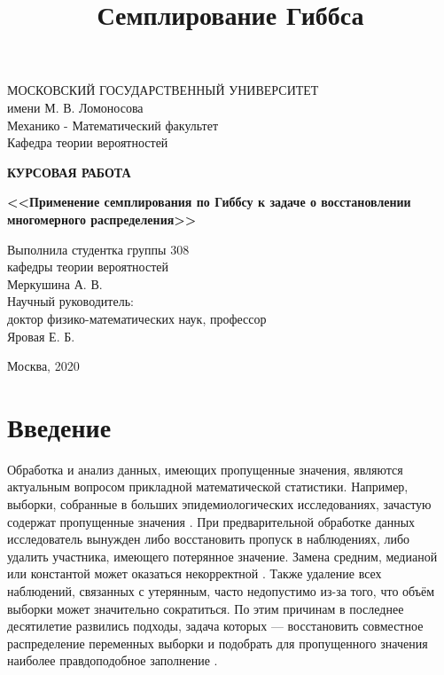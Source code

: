 \documentclass[14pt,a4paper]{article}
\title{Семплирование Гиббса}
\renewcommand{\contentsname}{ОГЛАВЛЕНИЕ}
\renewcommand*\contentsname{Содержание}
\begin{document}
	\thispagestyle{empty}
 
 
	\begin{center}
		{\large МОСКОВСКИЙ ГОСУДАРСТВЕННЫЙ УНИВЕРСИТЕТ\\ имени М. В. Ломоносова\\
			\vspace*{1em plus .6em minus .5em}
			Механико - Математический факультет\\
			Кафедра теории вероятностей}
	\end{center} 
	
	\vspace*{13em plus .6em minus .5em}
	\begin{center}
		{\LARGE \textbf{КУРСОВАЯ РАБОТА}}
		
		\bigskip
		
		{\large \textbf {<<Применение семплирования по Гиббсу к задаче о восстановлении многомерного распределения>>}}
	\end{center}
	
	\vspace*{10em plus .6em minus .5em}
	
	\begin{flushright}
		Выполнила студентка группы 308
		\\кафедры теории вероятностей
		\\ Меркушина А. В.
		\[\]
		Научный руководитель:
		\\доктор физико-математических наук, профессор
		\\Яровая Е. Б.
	\end{flushright}
	
	\vspace*{11em plus .4em minus .5em}
	\begin{center}
		Москва, 2020
	\end{center}

	\newpage
 \renewcommand{\contentsname}{Содержание}
\tableofcontents

\newpage
{}
\section*{Введение}
Обработка и анализ данных, имеющих пропущенные значения, являются актуальным вопросом прикладной математической статистики. Например, выборки, собранные в больших эпидемиологических исследованиях, зачастую содержат пропущенные значения \cite{la}. При предварительной обработке данных исследователь вынужден либо восстановить пропуск в наблюдениях, либо удалить участника, имеющего потерянное значение. Замена средним, медианой или константой может оказаться некорректной \cite{b}. Также удаление всех наблюдений, связанных с утерянным, часто недопустимо из-за того, что объём выборки может значительно сократиться. По этим причинам в последнее десятилетие развились подходы, задача которых --- восстановить совместное распределение переменных выборки и подобрать для пропущенного значения наиболее правдоподобное заполнение \cite{b}. %
\end{document}
